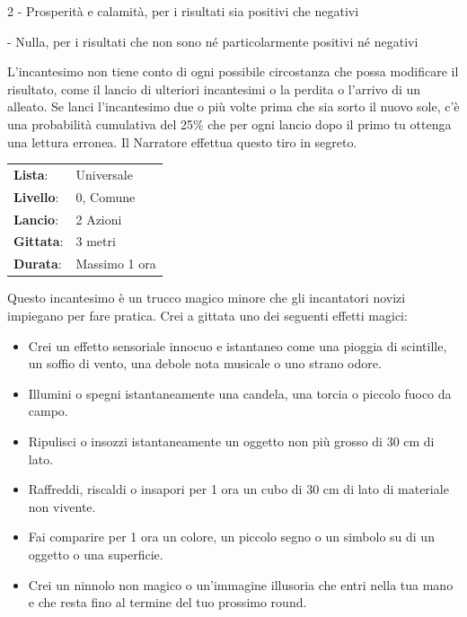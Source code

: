 \begin{multicols}{2}
- Prosperità e calamità, per i risultati sia positivi che negativi

- Nulla, per i risultati che non sono né particolarmente positivi né negativi

L'incantesimo non tiene conto di ogni possibile circostanza che possa modificare il risultato, come il lancio di ulteriori incantesimi o la perdita o l'arrivo di un alleato. Se lanci l'incantesimo due o più volte prima che sia sorto il nuovo sole, c'è una probabilità cumulativa del 25\% che per ogni lancio dopo il primo tu ottenga una lettura erronea. Il Narratore effettua questo tiro in segreto.

\noindent\begin{tabularx}{\linewidth}{p{1.9cm}X}
	\rowcolor{gray!20}\textbf{Lista}: & Universale \\
	\textbf{Livello}: & 0, Comune \\
	\rowcolor{gray!20}\textbf{Lancio}: & 2 Azioni \\
	\textbf{Gittata}: & 3 metri \\
	\rowcolor{gray!20}\textbf{Durata}: & Massimo 1 ora \\
\end{tabularx}\smallskip

Questo incantesimo è un trucco magico minore che gli incantatori novizi impiegano per fare pratica. Crei a gittata uno dei seguenti effetti magici:

\begin{itemize}[leftmargin=*] \setlength{\itemsep}{0pt}
	\item Crei un effetto sensoriale innocuo e istantaneo come una pioggia di scintille, un soffio di vento, una debole nota musicale o uno strano odore.
	\item Illumini o spegni istantaneamente una candela, una torcia o piccolo fuoco da campo.
	\item Ripulisci o insozzi istantaneamente un oggetto non più grosso di 30 cm di lato.
	\item Raffreddi, riscaldi o insapori per 1 ora un cubo di 30 cm di lato di materiale non vivente.
	\item Fai comparire per 1 ora un colore, un piccolo segno o un simbolo su di un oggetto o una superficie.
	\item Crei un ninnolo non magico o un'immagine illusoria che entri nella tua mano e che resta fino al termine del tuo prossimo round.
\end{itemize}


\end{multicols}
